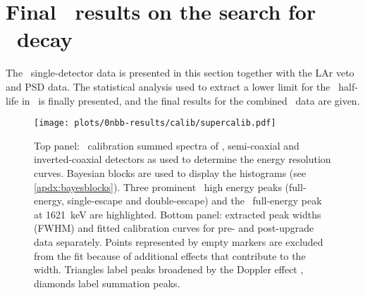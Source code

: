 \section{\texorpdfstring{Final \gerda\ results on the search for \onbb\ decay}{Final \gerda\ results on the search for 0nbb decay}}%
\label{sec:gerda:ana}

The \phasetwo\ single-detector data is presented in this section together with the LAr
veto and PSD data.  The statistical analysis used to extract a lower limit for the \onbb\
half-life in \gesix\ is finally presented, and the final results for the combined \gerda\
data are given.

\begin{figure}
  \centering
  \texttt{[image: plots/0nbb-results/calib/supercalib.pdf]}
  \caption{%
    Top panel: \Th\ calibration summed spectra of \bege, semi-coaxial and inverted-coaxial
    detectors as used to determine the energy resolution curves. Bayesian blocks are used
    to display the histograms (see \cref{apdx:bayesblocks}). Three prominent \Tl\ high
    energy peaks (full-energy, single-escape and double-escape) and the \Bil\
    full-energy peak at 1621~keV are highlighted. Bottom panel: extracted peak widths
    (FWHM) and fitted calibration curves for pre- and post-upgrade data separately. Points
    represented by empty markers are excluded from the fit because of additional effects
    that contribute to the width. Triangles label peaks broadened by the Doppler effect
    \fillme{ref?}, diamonds label summation peaks.
  }\label{fig:gerda:calib-desc}
\end{figure}

